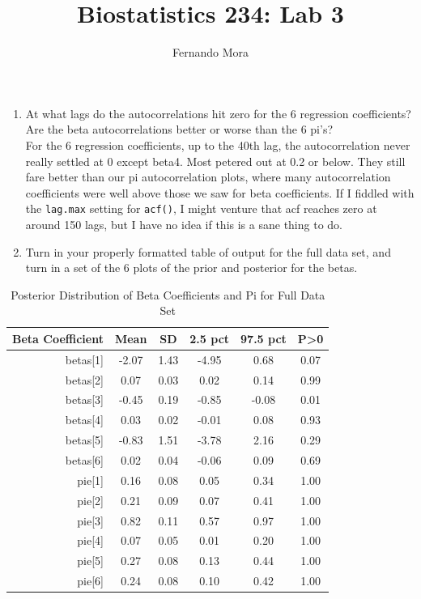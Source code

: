 \documentclass[
]{article}
\title{Biostatistics 234: Lab 3}
\author{Fernando Mora}
\date{}
\begin{document}
\maketitle

\begin{enumerate}
\def\labelenumi{\arabic{enumi}.}
\item
  At what lags do the autocorrelations hit zero for the 6 regression
  coefficients? Are the beta autocorrelations better or worse than the 6
  pi's?\\
  For the 6 regression coefficients, up to the 40th lag, the
  autocorrelation never really settled at 0 except beta4. Most petered
  out at 0.2 or below. They still fare better than our pi
  autocorrelation plots, where many autocorrelation coefficients were
  well above those we saw for beta coefficients. If I fiddled with the
  \texttt{lag.max} setting for \texttt{acf()}, I might venture that acf
  reaches zero at around 150 lags, but I have no idea if this is a sane
  thing to do.
\item
  Turn in your properly formatted table of output for the full data set,
  and turn in a set of the 6 plots of the prior and posterior for the
  betas.
\end{enumerate}

\begin{table}[h]

\begin{center}
\begin{threeparttable}

\caption{\label{tab:unnamed-chunk-5}Posterior Distribution of Beta Coefficients and Pi for Full Data Set}

\begin{tabular}{rccccc}
\toprule
Beta Coefficient & Mean & SD & 2.5 pct & 97.5 pct & P>0\\
\midrule
betas[1] & -2.07 & 1.43 & -4.95 & 0.68 & 0.07\\
betas[2] & 0.07 & 0.03 & 0.02 & 0.14 & 0.99\\
betas[3] & -0.45 & 0.19 & -0.85 & -0.08 & 0.01\\
betas[4] & 0.03 & 0.02 & -0.01 & 0.08 & 0.93\\
betas[5] & -0.83 & 1.51 & -3.78 & 2.16 & 0.29\\
betas[6] & 0.02 & 0.04 & -0.06 & 0.09 & 0.69\\
pie[1] & 0.16 & 0.08 & 0.05 & 0.34 & 1.00\\
pie[2] & 0.21 & 0.09 & 0.07 & 0.41 & 1.00\\
pie[3] & 0.82 & 0.11 & 0.57 & 0.97 & 1.00\\
pie[4] & 0.07 & 0.05 & 0.01 & 0.20 & 1.00\\
pie[5] & 0.27 & 0.08 & 0.13 & 0.44 & 1.00\\
pie[6] & 0.24 & 0.08 & 0.10 & 0.42 & 1.00\\
\bottomrule
\end{tabular}

\end{threeparttable}
\end{center}

\end{table}
\end{document}

